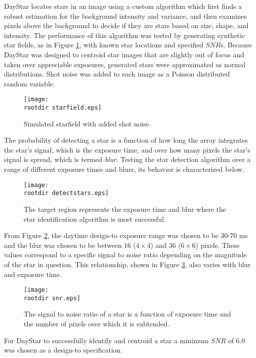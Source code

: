 \documentclass[twocolumn,letterpaper]{IEEEAerospace2012}
\newcommand{\rootdir}{./Figures/}
\newcommand{\SNR}{\mathit{SNR}}
\begin{document}
DayStar locates stars in an image using a custom algorithm which first finds a robust estimation for the background intensity and variance, and then examines pixels above the background to decide if they are stars based on size, shape, and intensity. The performance of this algorithm was tested by generating synthetic star fields, as in Figure \ref{fig:starfield}, with known star locations and specified $\SNR$s. Because DayStar was designed to centroid star images that are slightly out of focus and taken over appreciable exposures, generated stars were approximated as normal distributions. Shot noise was added to each image as a Poisson distributed random variable.
\begin{figure}
    \centering
    \texttt{[image: \\rootdir starfield.eps]}
    \caption{Simulated starfield with added shot noise.}
    \label{fig:starfield}
\end{figure}
The probability of detecting a star is a function of how long the array integrates the star's signal, which is the exposure time, and over how many pixels the star's signal is spread, which is termed \emph{blur}. Testing the star detection algorithm over a range of different exposure times and blurs, its behavior is characterized below.
\begin{figure}[H]
    \centering
    \texttt{[image: \\rootdir detectstars.eps]}
    \caption{The target region represents the exposure time and blur where the star identification algorithm is most successful.}
    \label{fig:detectstars}
\end{figure}
From Figure \ref{fig:detectstars}, the daytime design-to exposure range was chosen to be 30-70 ms and the blur was chosen to be between $16$ ($4 \times 4$) and $36$ ($6 \times 6$) pixels. These values correspond to a specific signal to noise ratio depending on the magnitude of the star in question. This relationship, shown in Figure \ref{fig:snr}, also varies with blur and exposure time.
\begin{figure}
    \centering
    \texttt{[image: \\rootdir snr.eps]}
    \caption{The signal to noise ratio of a star is a function of exposure time and the number of pixels over which it is subtended.}
    \label{fig:snr}
\end{figure}
For DayStar to successfully identify and centroid a star a minimum $\SNR$ of 6.0 was chosen as a design-to specification.
\end{document}
